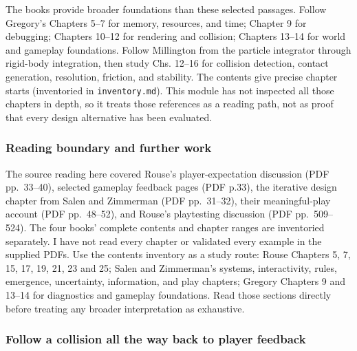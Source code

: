 \hypertarget{06-engine-ii-ch042-what-to-study-next}{}

The books provide broader foundations than these selected passages. Follow Gregory's Chapters 5--7 for memory, resources, and time; Chapter 9 for debugging; Chapters 10--12 for rendering and collision; Chapters 13--14 for world and gameplay foundations. Follow Millington from the particle integrator through rigid-body integration, then study Chs. 12--16 for collision detection, contact generation, resolution, friction, and stability. The contents give precise chapter starts (inventoried in \texttt{inventory.md}). This module has not inspected all those chapters in depth, so it treats those references as a reading path, not as proof that every design alternative has been evaluated.

\subsubsection{Reading boundary and further work}\label{06-engine-ii-ch042-reading-boundary-and-further-work}

\hypertarget{06-engine-ii-ch042-reading-boundary-and-further-work}{}

The source reading here covered Rouse's player-expectation discussion (PDF pp.~33--40), selected gameplay feedback pages (PDF p.33), the iterative design chapter from Salen and Zimmerman (PDF pp.~31--32), their meaningful-play account (PDF pp.~48--52), and Rouse's playtesting discussion (PDF pp.~509--524). The four books' complete contents and chapter ranges are inventoried separately. I have not read every chapter or validated every example in the supplied PDFs. Use the contents inventory as a study route: Rouse Chapters 5, 7, 15, 17, 19, 21, 23 and 25; Salen and Zimmerman's systems, interactivity, rules, emergence, uncertainty, information, and play chapters; Gregory Chapters 9 and 13--14 for diagnostics and gameplay foundations. Read those sections directly before treating any broader interpretation as exhaustive.

\subsubsection{Follow a collision all the way back to player feedback}\label{06-engine-ii-ch042-follow-a-collision-all-the-way-back-to-player-feedback}

\hypertarget{06-engine-ii-ch042-follow-a-collision-all-the-way-back-to-player-feedback}{}

